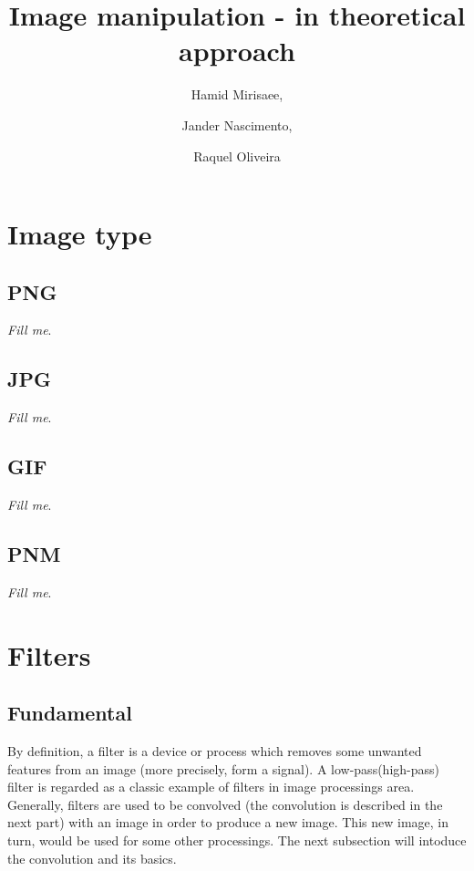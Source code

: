 \documentclass{report}
\begin{document}
\title{Image manipulation - in theoretical approach}

\author{Hamid Mirisaee,
\and Jander Nascimento, 
\and Raquel Oliveira}

\maketitle

\tableofcontents

\section{Image type}

	\subsection{PNG}

		\textit{Fill me}.

	\subsection{JPG}

		\textit{Fill me}.

	\subsection{GIF}

		\textit{Fill me}.

	\subsection{PNM}

		\textit{Fill me}.

\section{Filters}

	\subsection{Fundamental}

		By definition, a filter is a device or process which removes some unwanted features from an image (more precisely, form a signal).
		A low-pass(high-pass) filter is regarded as a classic example of filters in image processings area. Generally, filters are used to be convolved 
		(the convolution is described in the 
		next part) with an image in order to produce a new image. This new image, in turn, would be used for some other processings. The next subsection will
		intoduce the convolution and its basics.
		
\end{document}

